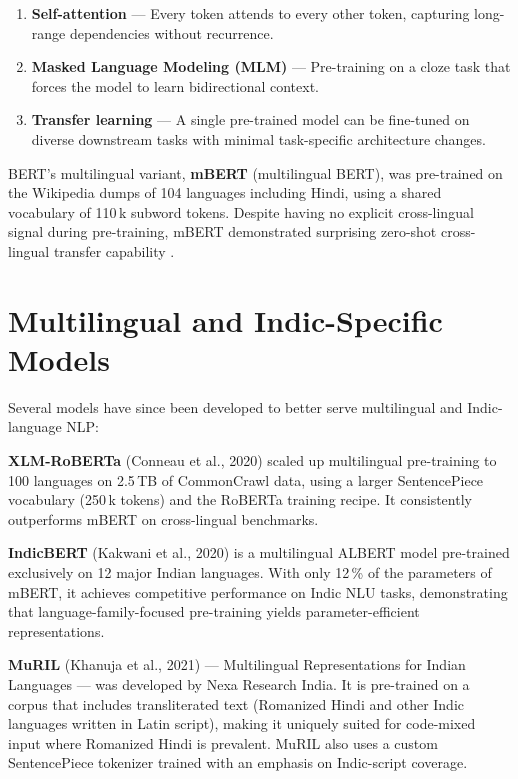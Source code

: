 \documentclass[12pt,a4paper]{report}
\begin{document}
\begin{enumerate}[itemsep=3pt]
  \item \textbf{Self-attention} — Every token attends to every other token, capturing long-range dependencies without recurrence.
  \item \textbf{Masked Language Modeling (MLM)} — Pre-training on a cloze task that forces the model to learn bidirectional context.
  \item \textbf{Transfer learning} — A single pre-trained model can be fine-tuned on diverse downstream tasks with minimal task-specific architecture changes.
\end{enumerate}

BERT's multilingual variant, \textbf{mBERT} (multilingual BERT), was pre-trained on the Wikipedia dumps of 104 languages including Hindi, using a shared vocabulary of 110\,k subword tokens. Despite having no explicit cross-lingual signal during pre-training, mBERT demonstrated surprising zero-shot cross-lingual transfer capability \cite{pires2019}.

\section{Multilingual and Indic-Specific Models}

Several models have since been developed to better serve multilingual and Indic-language NLP:

\textbf{XLM-RoBERTa} (Conneau et al., 2020) \cite{conneau2020} scaled up multilingual pre-training to 100 languages on 2.5\,TB of CommonCrawl data, using a larger SentencePiece vocabulary (250\,k tokens) and the RoBERTa training recipe. It consistently outperforms mBERT on cross-lingual benchmarks.

\textbf{IndicBERT} (Kakwani et al., 2020) \cite{kakwani2020} is a multilingual ALBERT model pre-trained exclusively on 12 major Indian languages. With only 12\,\% of the parameters of mBERT, it achieves competitive performance on Indic NLU tasks, demonstrating that language-family-focused pre-training yields parameter-efficient representations.

\textbf{MuRIL} (Khanuja et al., 2021) \cite{khanuja2021} — Multilingual Representations for Indian Languages — was developed by Nexa Research India. It is pre-trained on a corpus that includes transliterated text (Romanized Hindi and other Indic languages written in Latin script), making it uniquely suited for code-mixed input where Romanized Hindi is prevalent. MuRIL also uses a custom SentencePiece tokenizer trained with an emphasis on Indic-script coverage.
\end{document}
